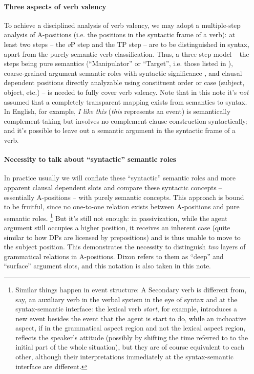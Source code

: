 \documentclass[a4paper, oneside, 12pt]{report}
\newcommand*{\citesec}[1]{\S~{#1}}
\newcommand{\form}[1]{\emph{#1}}
\newcommand{\vP}{\textit{v}P}
\begin{document}
{\paragraph{Three aspects of verb valency} 
To achieve a disciplined analysis of verb valency, 
we may adopt a multiple-step analysis of A-positions
(i.e. the positions in the syntactic frame of a verb):
at least two steps -- the \vP{} step and the TP step 
-- are to be distinguished in syntax, 
apart from the purely semantic verb classification.
Thus, a three-step model -- 
the steps being pure semantics
(``Manipulator'' or ``Target'', i.e. those listed in \citet{dixon2005semantic}), 
coarse-grained argument semantic roles with syntactic significance 
\citep[\citesec{4.2}]{cgel}, 
and clausal dependent positions directly analyzable using constituent order or case
(subject, object, etc.) -- 
is needed to fully cover verb valency.
Note that in this note it's \emph{not} assumed that 
a completely transparent mapping exists 
from semantics to syntax.
In English, for example, \form{I like this} 
(\form{this} represents an event)
is semantically complement-taking 
but involves no complement clause construction syntactically;
and it's possible to leave out a semantic argument in the syntactic frame of a verb.

\paragraph{Necessity to talk about ``syntactic''  semantic roles} 
In practice usually we will conflate these ``syntactic'' semantic roles 
and more apparent clausal dependent slots 
and compare these syntactic concepts 
-- essentially A-positions -- with purely semantic concepts.
This approach is bound to be fruitful, 
since no one-to-one relation exists between A-positions and pure semantic roles.%
\footnote{
    Similar things happen in event structure: 
    A Secondary verb is different from, say, an auxiliary verb in the verbal system
    in the eye of syntax 
    and at the syntax-semantic interface:
    the lexical verb \form{start}, for example, 
    introduces a new event besides the event that the agent is start to do, 
    while an inchoative aspect, 
    if in the grammatical aspect region and not the lexical aspect region,
    reflects the speaker's attitude
    (possibly by shifting the time referred to 
    to the initial part of the whole situation),
    but they are of course equivalent to each other,
    although their interpretations 
    immediately at the syntax-semantic interface 
    are different.
}
But it's still not enough: in passivization, 
while the agent argument still occupies a higher position,
it receives an inherent case (quite similar to how DPs are licensed by prepositions)
and is thus unable to move to the subject position.
This demonstrates the necessity to distinguish \emph{two} layers of grammatical relations in A-positions.
Dixon refers to them as ``deep'' and ``surface'' argument slots, 
and this notation is also taken in this note.

}
\end{document}
